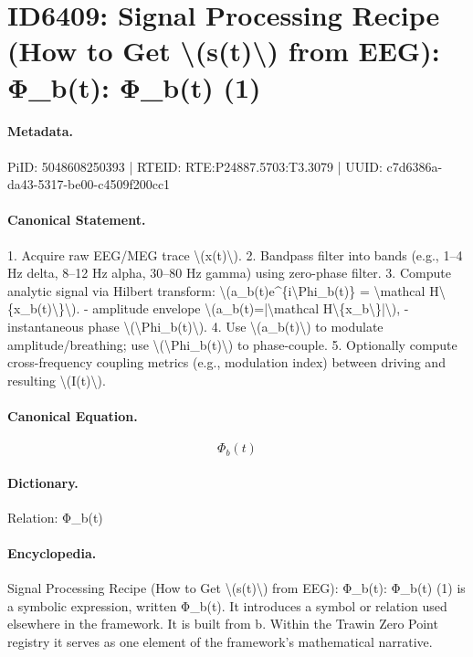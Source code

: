 \section*{ID6409: Signal Processing Recipe (How to Get \textbackslash{}(s(t)\textbackslash{}) from EEG): Φ\_b(t): Φ\_b(t) (1)}
\paragraph{Metadata.}
PiID: 5048608250393 | RTEID: RTE:P24887.5703:T3.3079 | UUID: c7d6386a-da43-5317-be00-c4509f200cc1

\paragraph{Canonical Statement.}
1. Acquire raw EEG/MEG trace \textbackslash{}(x(t)\textbackslash{}). 2. Bandpass filter into bands (e.g., 1–4 Hz delta, 8–12 Hz alpha, 30–80 Hz gamma) using zero-phase filter. 3. Compute analytic signal via Hilbert transform: \textbackslash{}(a\_b(t)e\textasciicircum{}\{i\textbackslash{}Phi\_b(t)\} = \textbackslash{}mathcal H\textbackslash{}\{x\_b(t)\textbackslash{}\}\textbackslash{}). - amplitude envelope \textbackslash{}(a\_b(t)=|\textbackslash{}mathcal H\textbackslash{}\{x\_b\textbackslash{}\}|\textbackslash{}), - instantaneous phase \textbackslash{}(\textbackslash{}Phi\_b(t)\textbackslash{}). 4. Use \textbackslash{}(a\_b(t)\textbackslash{}) to modulate amplitude/breathing; use \textbackslash{}(\textbackslash{}Phi\_b(t)\textbackslash{}) to phase-couple. 5. Optionally compute cross-frequency coupling metrics (e.g., modulation index) between driving and resulting \textbackslash{}(I(t)\textbackslash{}).

\paragraph{Canonical Equation.}
\[
\Phi_b(t)
\]

\paragraph{Dictionary.}
Relation: Φ\_b(t)

\paragraph{Encyclopedia.}
Signal Processing Recipe (How to Get \textbackslash{}(s(t)\textbackslash{}) from EEG): Φ\_b(t): Φ\_b(t) (1) is a symbolic expression, written Φ\_b(t). It introduces a symbol or relation used elsewhere in the framework. It is built from b. Within the Trawin Zero Point registry it serves as one element of the framework's mathematical narrative.
